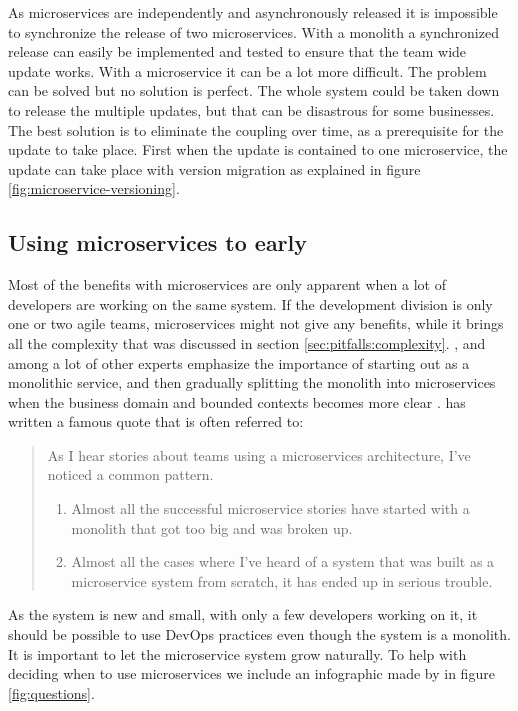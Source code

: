 \documentclass[a4paper]{article}
\begin{document}
As microservices are independently and asynchronously released it is impossible to synchronize the release of two microservices. With a monolith a synchronized release can easily be implemented and tested to ensure that the team wide update works. With a microservice it can be a lot more difficult. The problem can be solved but no solution is perfect. The whole system could be taken down to release the multiple updates, but that can be disastrous for some businesses. The best solution is to eliminate the coupling over time, as a prerequisite for the update to take place. First when the update is contained to one microservice, the update can take place with version migration as explained in figure \ref{fig:microservice-versioning}.

\subsection{Using microservices to early}
Most of the benefits with microservices are only apparent when a lot of developers are working on the same system. If the development division is only one or two agile teams, microservices might not give any benefits, while it brings all the complexity that was discussed in section \ref{sec:pitfalls:complexity}. \citeauthor{Fowler2015}, \citeauthor{Newman2015} and \citeauthor{Buijze2018} among a lot of other experts emphasize the importance of starting out as a monolithic service, and then gradually splitting the monolith into microservices when the business domain and bounded contexts becomes more clear \cite{Fowler2015,Newman2015,Buijze2018}. \citeauthor{Fowler2015} has written a famous quote that is often referred to:
\begin{quote}
As I hear stories about teams using a microservices architecture, I've noticed a common pattern.
\begin{enumerate}
    \item Almost all the successful microservice stories have started with a monolith that got too big and was broken up.
    \item Almost all the cases where I've heard of a system that was built as a microservice system from scratch, it has ended up in serious trouble.\cite{Fowler2015}
\end{enumerate}

\end{quote}

As the system is new and small, with only a few developers working on it, it should be possible to use DevOps practices even though the system is a monolith. It is important to let the microservice system grow naturally. To help with deciding when to use microservices we include an infographic made by \citeauthor{Kerr} in figure \ref{fig:questions}.
\end{document}
